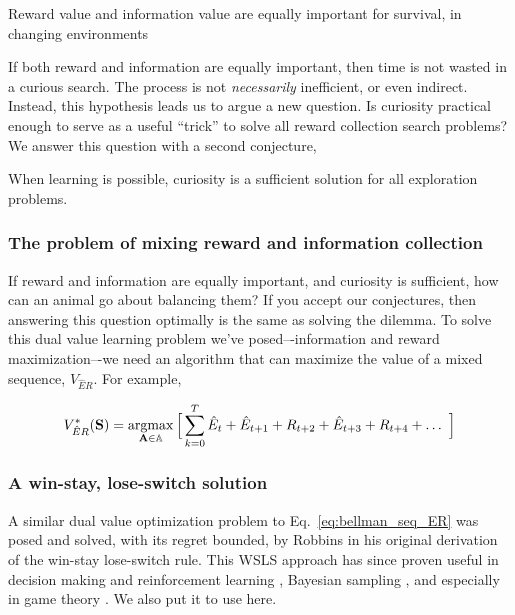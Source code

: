 \begin{conjecture}
	Reward value and information value are equally important for survival, in changing environments 
\end{conjecture}

If both reward and information are equally important, then time is not wasted in a curious search. The process is not \textit{necessarily} inefficient, or even indirect. Instead, this hypothesis leads us to argue a new question. Is curiosity practical enough to serve as a useful ``trick'' to solve all reward collection search problems? We answer this question with a second conjecture,

\begin{conjecture}
	When learning is possible, curiosity is a sufficient solution for all exploration problems.
\end{conjecture}


\subsubsection*{The problem of mixing reward and information collection}
If reward and information are equally important, and curiosity is sufficient, how can an animal go about balancing them? If you accept our conjectures, then answering this question optimally is the same as solving the dilemma. To solve this dual value learning problem we’ve posed–-information and reward maximization–-we need an algorithm that can maximize the value of a mixed sequence, $V_{\hat{E}R}$. For example,

\begin{equation}
	\label{eq:bellman_seq_ER}
	V^*_{\hat{E}R}(\mathbf{S}) = \operatorname*{argmax}_{\mathbf{A} \in \mathbb{A}} \Big [\sum_{k=0}^{T} \hat{E}_t + \hat{E}_{t+1} + R_{t+2} + \hat{E}_{t+3} + R_{t+4} + \ldots  \ \Big ]
\end{equation}

\subsubsection*{A win-stay, lose-switch solution}
A similar dual value optimization problem to Eq.~\ref{eq:bellman_seq_ER} was posed and solved, with its regret bounded, by Robbins \cite{Robbins1952} in his original derivation of the win-stay lose-switch rule. This WSLS approach has since proven useful in decision making and reinforcement learning \cite{Estes1994TowardAS,Worthy2014}, Bayesian sampling \cite{Bonawitz2014}, and especially in game theory \cite{Nowak1993}. We also put it to use here. 

